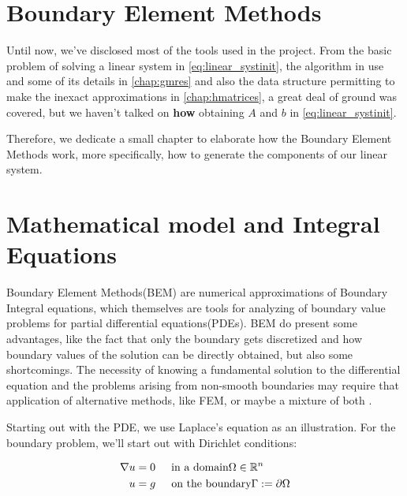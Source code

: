 \section{Boundary Element Methods}

Until now, we've disclosed most of the tools used in the project. From the basic problem of solving a linear system in \ref{eq:linear_systinit}, the algorithm in use and some of its details in \autoref{chap:gmres} and also the data structure permitting to make the inexact approximations in \autoref{chap:hmatrices}, a great deal of ground was covered, but we haven't talked on \textbf{how} obtaining $A$ and $b$ in \ref{eq:linear_systinit}.

Therefore, we dedicate a small chapter to elaborate how the Boundary Element Methods work, more specifically, how to generate the components of our linear system.

\section{Mathematical model and Integral Equations}

Boundary Element Methods(BEM) are numerical approximations of Boundary Integral equations, which themselves are tools for analyzing of boundary value problems for partial differential equations(PDEs). BEM do present some advantages, like the fact that only the boundary gets discretized and how boundary values of the solution can be directly obtained, but also some shortcomings. The necessity of knowing a fundamental solution to the differential equation and the problems arising from non-smooth boundaries may require that application of alternative methods, like FEM, or maybe a mixture of both \cite{costabel1987principles}.

Starting out with the PDE, we use Laplace's equation as an illustration. For the boundary problem, we'll start out with Dirichlet conditions:


\begin{align}\label{eq:pde_model}
    \begin{split}
        \nabla u &= 0 \hspace{0.2in} \text{in a domain} \Omega \in \mathbb{R}^{n}\\
        u &= g \hspace{0.2in} \text{on the boundary} \Gamma := \partial \Omega
    \end{split}
\end{align}

